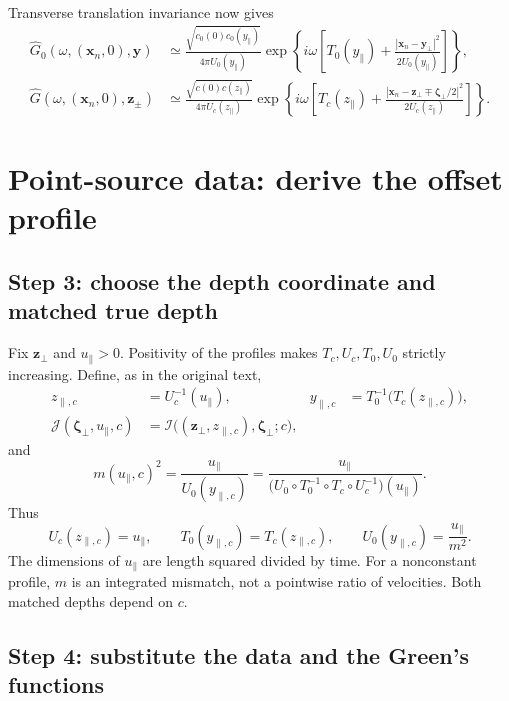 \documentclass[11pt]{article}
\newcommand{\bx}{\bm{x}}
\newcommand{\by}{\bm{y}}
\newcommand{\bz}{\bm{z}}
\newcommand{\bzeta}{\boldsymbol{\zeta}}
\begin{document}
Transverse translation invariance now gives
\begin{align}
\widehat G_0(\omega,(\bx_n,0),\by)
&\simeq\frac{\sqrt{c_0(0)c_0(y_\parallel)}}{4\pi U_0(y_\parallel)}
\exp\!\left\{i\omega\left[T_0(y_\parallel)
+\frac{|\bx_n-\by_\perp|^2}{2U_0(y_\parallel)}\right]\right\},
\label{eq:G0}\\
\widehat G(\omega,(\bx_n,0),\bz_\pm)
&\simeq\frac{\sqrt{c(0)c(z_\parallel)}}{4\pi U_c(z_\parallel)}
\exp\!\left\{i\omega\left[T_c(z_\parallel)
+\frac{|\bx_n-\bz_\perp\mp\bzeta_\perp/2|^2}{2U_c(z_\parallel)}\right]\right\}.
\label{eq:Gc}
\end{align}

\section{Point-source data: derive the offset profile}

\subsection{Step 3: choose the depth coordinate and matched true depth}

Fix $\bz_\perp$ and $u_\parallel>0$. Positivity of the profiles makes
$T_c,U_c,T_0,U_0$ strictly increasing. Define, as in the original text,
\begin{align}
z_{\parallel,c}&=U_c^{-1}(u_\parallel),
&y_{\parallel,c}&=T_0^{-1}\big(T_c(z_{\parallel,c})\big),
\label{eq:matched-depths}\\
\mathcal J(\bzeta_\perp,u_\parallel,c)
&=\mathcal I\big((\bz_\perp,z_{\parallel,c}),\bzeta_\perp;c\big),
\label{eq:Jdef}
\end{align}
and
\begin{equation}
m(u_\parallel,c)^2
=\frac{u_\parallel}{U_0(y_{\parallel,c})}
=\frac{u_\parallel}
{\big(U_0\circ T_0^{-1}\circ T_c\circ U_c^{-1}\big)(u_\parallel)}.
\label{eq:m}
\end{equation}
Thus
\begin{equation}
U_c(z_{\parallel,c})=u_\parallel,\qquad
T_0(y_{\parallel,c})=T_c(z_{\parallel,c}),\qquad
U_0(y_{\parallel,c})=\frac{u_\parallel}{m^2}.
\label{eq:matching}
\end{equation}
The dimensions of $u_\parallel$ are length squared divided by time.
For a nonconstant profile, $m$ is an integrated mismatch, not a
pointwise ratio of velocities. Both matched depths depend on $c$.

\subsection{Step 4: substitute the data and the Green's functions}
\end{document}
